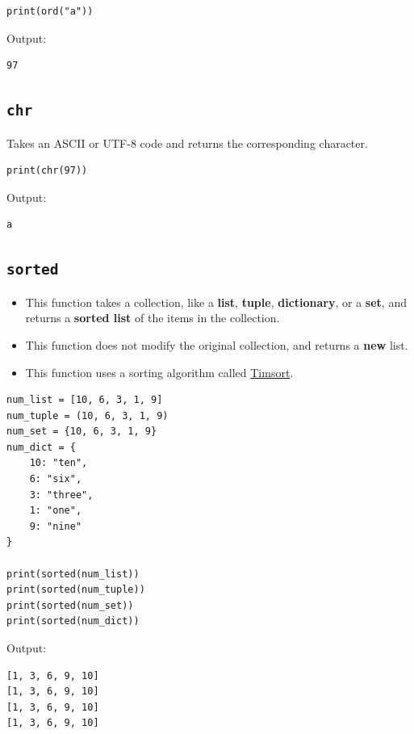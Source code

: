 \documentclass[11pt]{article}
\begin{document}
\begin{verbatim}
print(ord("a"))
\end{verbatim}

 \noindent Output:

\begin{verbatim}
97
\end{verbatim}

\subsection{\texttt{chr}}
\label{sec:org8b62008}
Takes an ASCII or UTF-8 code and returns the corresponding character.

\begin{verbatim}
print(chr(97))
\end{verbatim}

 \noindent Output:

\begin{verbatim}
a
\end{verbatim}


 \newpage

\subsection{\texttt{sorted}}
\label{sec:org5f175f6}
\begin{itemize}
\item This function takes a collection, like a \textbf{list}, \textbf{tuple}, \textbf{dictionary}, or a \textbf{set}, and returns a \textbf{sorted list} of the items in the collection.
\item This function does not modify the original collection, and returns a \textbf{new} list.
\item This function uses a sorting algorithm called \href{https://en.wikipedia.org/wiki/Timsort}{Timsort}.
\end{itemize}

\begin{verbatim}
num_list = [10, 6, 3, 1, 9]
num_tuple = (10, 6, 3, 1, 9)
num_set = {10, 6, 3, 1, 9}
num_dict = {
    10: "ten",
    6: "six",
    3: "three",
    1: "one",
    9: "nine"
}

print(sorted(num_list))
print(sorted(num_tuple))
print(sorted(num_set))
print(sorted(num_dict))
\end{verbatim}

 \noindent Output:

\begin{verbatim}
[1, 3, 6, 9, 10]
[1, 3, 6, 9, 10]
[1, 3, 6, 9, 10]
[1, 3, 6, 9, 10]
\end{verbatim}
\end{document}
